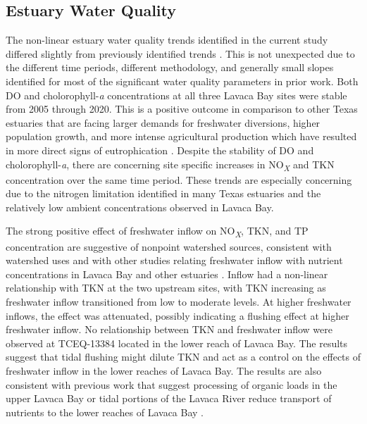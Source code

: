 \documentclass[fleqn,10pt,lineno]{wlpeerj} %
\begin{document}
\hypertarget{estuary-water-quality}{%
\subsection*{Estuary Water Quality}\label{estuary-water-quality}}

The non-linear estuary water quality trends identified in the current
study differed slightly from previously identified trends
\autocite{bugica_water_2020}. This is not unexpected due to the
different time periods, different methodology, and generally small
slopes identified for most of the significant water quality parameters
in prior work. Both DO and cholorophyll-\emph{a} concentrations at all
three Lavaca Bay sites were stable from 2005 through 2020. This is a
positive outcome in comparison to other Texas estuaries that are facing
larger demands for freshwater diversions, higher population growth, and
more intense agricultural production which have resulted in more direct
signs of eutrophication
\autocite{wetzWaterQualityDynamics2016,bugica_water_2020}. Despite the
stability of DO and cholorophyll-\emph{a}, there are concerning site
specific increases in NO\textsubscript{\emph{X}} and TKN concentration
over the same time period. These trends are especially concerning due to
the nitrogen limitation identified in many Texas estuaries
\autocite{gardnerNitrogenFixationDissimilatory2006,houTransformationFateNitrate2012,doradoUnderstandingInteractionsFreshwater2015,paudelRelationshipSuspendedSolids2019,wetz_exceptionally_2017}
and the relatively low ambient concentrations observed in Lavaca Bay.

The strong positive effect of freshwater inflow on
NO\textsubscript{\emph{X}}, TKN, and TP concentration are suggestive of
nonpoint watershed sources, consistent with watershed uses and with
other studies relating freshwater inflow with nutrient concentrations in
Lavaca Bay and other estuaries
\autocite{russell_effect_2006,caffreyHighNutrientPulses2007,peierlsNonmonotonicResponsesPhytoplankton2012,palmerImpactsDroughtsLow2015,ciraPhytoplanktonDynamicsLowinflow2021}.
Inflow had a non-linear relationship with TKN at the two upstream sites,
with TKN increasing as freshwater inflow transitioned from low to
moderate levels. At higher freshwater inflows, the effect was
attenuated, possibly indicating a flushing effect at higher freshwater
inflow. No relationship between TKN and freshwater inflow were observed
at TCEQ-13384 located in the lower reach of Lavaca Bay. The results
suggest that tidal flushing might dilute TKN and act as a control on the
effects of freshwater inflow in the lower reaches of Lavaca Bay. The
results are also consistent with previous work that suggest processing
of organic loads in the upper Lavaca Bay or tidal portions of the Lavaca
River reduce transport of nutrients to the lower reaches of Lavaca Bay
\autocite{russell_effect_2006}.
\end{document}
